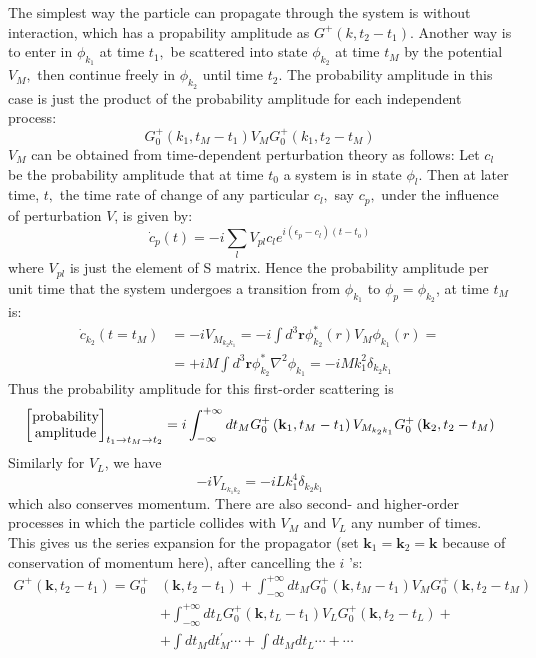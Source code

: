 The simplest way the particle can propagate through the system is without interaction, which has a propability amplitude as $G^+(k,t_2-t_1)$. Another way is to enter in $\phi_{k_{1}}$ at time $t_{1},$ be scattered into state $\phi_{k_{2}}$ at time $t_{M}$ by the potential $V_{M},$ then continue freely in $\phi_{k_{2}}$ until time $t_{2} .$ The probability amplitude in this case is just the product of the probability amplitude for each independent process:
$$
G^+_0(k_1,t_M-t_1)V_MG^+_0(k_1,t_2-t_M)
$$
$V_M$ can be obtained from time-dependent perturbation theory as follows: Let $c_{l}$ be the probability amplitude that at time $t_{0}$ a system is in state $\phi_{l} .$ Then at later time, $t,$ the time rate of change of any particular $c_{l},$ say $c_{p},$ under the influence of perturbation $V$, is given by:
\begin{equation}\dot{c}_{p}(t)=-i \sum_{l} V_{p l} c_{l} e^{i\left(\epsilon_{p}-c_{l}\right)\left(t-t_{o}\right)}\end{equation}
where $V_{pl}$ is just the element of S matrix. Hence the probability amplitude per unit time that the system undergoes a transition from $\phi_{k_1}$ to $\phi_p=\phi_{k_2}$, at time $t_M$ is:
\begin{equation}\begin{aligned}
\dot{c}_{k_{2}}\left(t=t_{M}\right) &=-i V_{M_{k_2 k_1}}=-i \int d^{3} \mathbf{r} \phi_{k_{2}}^{*}(r) V_{M} \phi_{k_{1}}(r)=\\
&=+i M \int d^{3} \mathbf{r} \phi_{k_{2}}^{*} \nabla^{2} \phi_{k_{1}}=-i M k_{1}^{2} \delta_{k_{2} k_{1}}
\end{aligned}\end{equation}
Thus the probability amplitude for this first-order scattering is 
\begin{equation}
    \left[\text{\stackanchor{probability}{amplitude}}\right]_{t_1\rightarrow t_M\rightarrow t_2}=i \int_{-\infty}^{+\infty} d t_{M} G_{0}^{+}\left(\mathbf{k}_{1}, t_{M}-t_{1}\right) V_{M_{k_2k_1}} G_{0}^{+}\left(\mathbf{k}_{2}, t_{2}-t_{M}\right)
\end{equation}
Similarly for $V_L$, we have
$$-i V_{L_{k_1k_2}}=-i L k_{1}^{4} \delta_{k_{2} k_{1}}$$
which also conserves momentum. There are also second- and higher-order processes in which the particle collides with $V_{M}$ and $V_{L}$ any number of times. This gives us the series expansion for the propagator (set $\mathbf{k}_{1}=\mathbf{k}_{2}=\mathbf{k}$ because of conservation of momentum here), after cancelling the $i$ 's:
$$\begin{aligned}
G^{+}\left(\mathbf{k}, t_{2}-t_{1}\right)=G_{0}^{+} &\left(\mathbf{k}, t_{2}-t_{1}\right)+\int_{-\infty}^{+\infty} d t_{M} G_{0}^{+}\left(\mathbf{k}, t_{M}-t_{1}\right) V_{M} G_{0}^{+}\left(\mathbf{k}, t_{2}-t_{M}\right) \\
&+\int_{-\infty}^{+\infty} d t_{L} G_{0}^{+}\left(\mathbf{k}, t_{L}-t_{1}\right) V_{L} G_{0}^{+}\left(\mathbf{k}, t_{2}-t_{L}\right)+\\
&+\int d t_{M} d t_{M}^{\prime} \cdots+\int d t_{M} d t_{L} \cdots+\cdots
\end{aligned}$$
